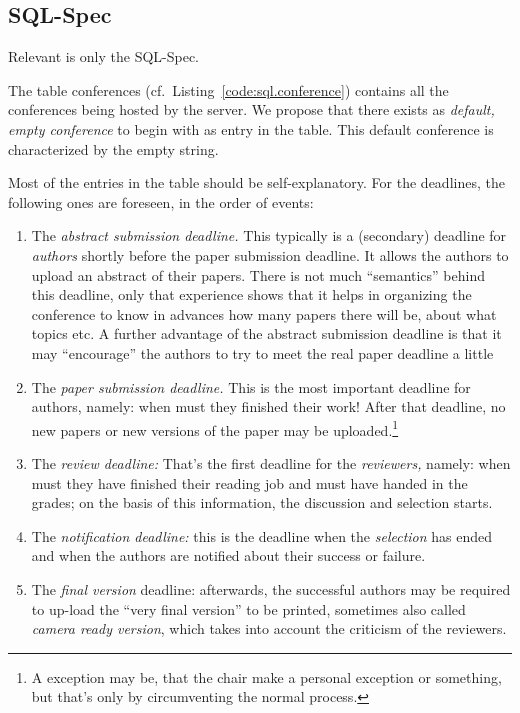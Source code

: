 \newpage


\subsection*{SQL-Spec}
\label{sec:sql}
\lstset{basicstyle=\scriptsize,numbers=left,numberstyle=\tiny,stepnumber=5,language=sql}

Relevant is only the SQL-Spec.



The table conferences (cf.\ Listing~\ref{code:sql.conference}) contains all
the conferences being hosted by the server. We propose that there exists as
\emph{default, empty conference} to begin with as entry in the table. This
default conference is characterized by the empty string. 


%

Most of the entries in the table should be self-explanatory.  For the
deadlines, the following ones are foreseen, in the order of events:
\begin{enumerate}
\item The \emph{abstract submission deadline.} This typically is a
  (secondary) deadline for \emph{authors} shortly before the paper
  submission deadline.  It allows the authors to upload an abstract of
  their papers. There is not much ``semantics'' behind this deadline, only
  that experience shows that it helps in organizing the conference to know
  in advances how many papers there will be, about what topics etc. A
  further advantage of the abstract submission deadline is that it may
  ``encourage'' the authors to try to meet the real paper deadline a little
\item The \emph{paper submission deadline.} This is the most important
  deadline for authors, namely: when must they finished their work! After
  that deadline, no new papers or new versions of the paper may be
  uploaded.\footnote{A exception may be, that the chair make a personal
    exception or something, but that's only by circumventing the normal
    process.}
\item The \emph{review deadline:} That's the first deadline for the
  \emph{reviewers,} namely: when must they have finished their reading job
  and must have handed in the grades; on the basis of this information, the
  discussion and selection starts.
\item The \emph{notification deadline:} this is the deadline when the
  \emph{selection} has ended and when the authors are notified about their
  success or failure.
\item The \emph{final version} deadline: afterwards, the successful authors
  may be required to up-load the ``very final version'' to be printed,
  sometimes also called \emph{camera ready version}, which takes into
  account the criticism of the reviewers.
\end{enumerate}


